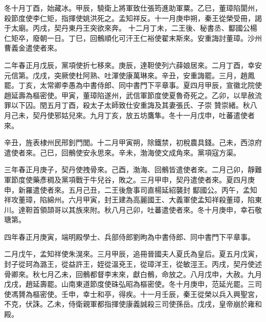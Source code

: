 \begin{pinyinscope}
 冬十月丁酉，始藏冰。甲辰，驍衛上將軍致仕張筠進助軍粟。乙巳，董璋陷閬州，殺節度使李仁矩，指揮使姚洪死之。孟知祥反。十一月庚申朔，秦王從榮受冊，謁于太廟。丙戌，契丹東丹王突欲來奔。
 十二月丁未，二王後、秘書丞、酅國公楊仁矩卒，廢朝一日。丁巳，回鶻順化可汗王仁裕使翟末斯來。安重誨討董璋。沙州曹義金遣使者來。



 二年春正月戊辰，黨項使折七移來。庚辰，達靼使列六薛娘居來。二月丁酉，幸安元信第。戊戌，突厥使杜阿熟、吐渾使康萬琳來。辛丑，安重誨罷。三月，趙鳳罷。丁亥，太常卿李愚為中書侍郎、同中書門下平章事。夏四月甲辰，宣徽北院使趙延壽為樞密使。甲寅，董璋陷遂州，武信軍節度使夏魯奇死之。乙卯，以旱赦流罪以下囚。閏五月丁酉，殺太子太師致仕安重誨及其妻張氏、子崇
 贊崇緒。秋八月己未，契丹使邪姑兒來。九月丁亥，放五坊鷹隼。冬十一月戊申，吐蕃遣使者來。



 辛丑，旌表棣州民邢釗門閭。十二月甲寅朔，除鐵禁，初稅農具錢。己未，西涼府遣使者來。己巳，回鶻使安永思來。辛未，渤海使文成角來。黨項寇方渠。



 三年春正月庚子，契丹使拽骨來。己酉，渤海、回鶻皆遣使者來。二月己卯，靜難軍節度使藥彥稠及黨項戰于牛兒谷，敗之。三月甲申，契丹遣使者來。夏四月庚申，新羅遣使者來。五月己丑，二王後詹事司直楊延紹襲封
 酅國公。丙午，孟知祥攻董璋，陷綿州。六月甲寅，封王建為高麗國王、大義軍使孟知祥殺董璋，陷東川。達靼首領頡哥以其族來附。秋八月己卯，吐蕃遣使者來。冬十月庚申，幸石敬瑭第。



 四年春正月庚寅，端明殿學士、兵部侍郎劉昫為中書侍郎、同中書門下平章事。



 二月戊午，孟知祥使朱滉來。三月甲辰，追冊晉國夫人夏氏為皇后。夏五月戊寅，封子從珂為潞王，從益許王，姪從溫兗王，從璋洋王，從敏涇王。丙戌，契丹使述
 骨卿來。秋七月乙未，回鶻都督李末來，獻白鶻，命放之。八月戊申，大赦。九月戊戌，趙延壽罷。山南東道節度使硃弘昭為樞密使。冬十月庚申，范延光罷。三司使馮贇為樞密使。壬申，幸士和亭，得疾。十一月壬辰，秦王從榮以兵入興聖宮，不克，伏誅。乙未，侍衛親軍都指揮使康義誠殺三司使孫岳。戊戌，皇帝崩於雍和殿。




\end{pinyinscope}
